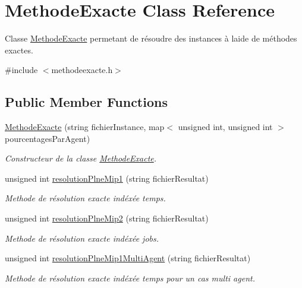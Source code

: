 \hypertarget{classMethodeExacte}{}\section{Methode\+Exacte Class Reference}
\label{classMethodeExacte}


Classe \hyperlink{classMethodeExacte}{Methode\+Exacte} permetant de résoudre des instances à l\textquotesingle{}aide de méthodes exactes.  




{\ttfamily \#include $<$methodeexacte.\+h$>$}

\subsection*{Public Member Functions}
\begin{DoxyCompactItemize}
\item 
\hyperlink{classMethodeExacte_a82cea9720ff44a85f2c991f601ffd53b}{Methode\+Exacte} (string fichier\+Instance, map$<$ unsigned int, unsigned int $>$ pourcentages\+Par\+Agent)
\begin{DoxyCompactList}\small\item\em Constructeur de la classe \hyperlink{classMethodeExacte}{Methode\+Exacte}. \end{DoxyCompactList}\item 
unsigned int \hyperlink{classMethodeExacte_a91443b3ea749912772b40b5b5c40379e}{resolution\+Plne\+Mip1} (string fichier\+Resultat)
\begin{DoxyCompactList}\small\item\em Methode de résolution exacte indéxée temps. \end{DoxyCompactList}\item 
unsigned int \hyperlink{classMethodeExacte_a3163e487cc9e99ee7667d1dd146edb4b}{resolution\+Plne\+Mip2} (string fichier\+Resultat)
\begin{DoxyCompactList}\small\item\em Methode de résolution exacte indéxée jobs. \end{DoxyCompactList}\item 
unsigned int \hyperlink{classMethodeExacte_a3b3d9ad4a6d21f6e3be43212eb706054}{resolution\+Plne\+Mip1\+Multi\+Agent} (string fichier\+Resultat)
\begin{DoxyCompactList}\small\item\em Methode de résolution exacte indéxée temps pour un cas multi agent. \end{DoxyCompactList}\item 

\end{DoxyCompactItemize}
